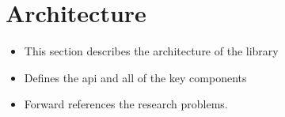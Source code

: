 \section{Architecture}

\begin{itemize}
    \item This section describes the architecture of the library
    \item Defines the api and all of the key components
    \item Forward references the research problems.
\end{itemize}